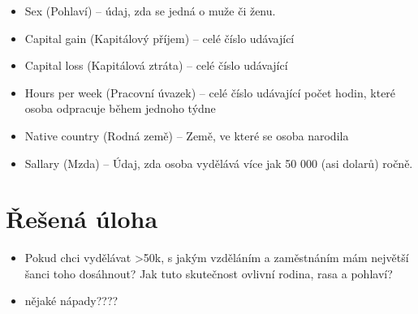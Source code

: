 \documentclass[11pt,a4paper,titlepage]{article}
\begin{document}
\begin{itemize}
                \item Sex (Pohlaví) -- údaj, zda se jedná o muže či ženu.
                \item Capital gain (Kapitálový příjem) -- celé číslo udávající 
                \item Capital loss (Kapitálová ztráta) -- celé číslo udávající 
                \item Hours per week (Pracovní úvazek) -- celé číslo udávající počet hodin, které osoba odpracuje během jednoho týdne
                \item Native country (Rodná země) -- Země, ve které se osoba narodila
                \item Sallary (Mzda) -- Údaj, zda osoba vydělává více jak 50 000 (asi dolarů) ročně.
            \end{itemize}
    
    \section{Řešená úloha}    
    \begin{itemize}
        \item Pokud chci vydělávat >50k, s jakým vzděláním a zaměstnáním mám největší šanci toho dosáhnout? Jak tuto skutečnost ovlivní rodina, rasa a pohlaví?
        \item nějaké nápady????
    \end{itemize}
\end{document}
